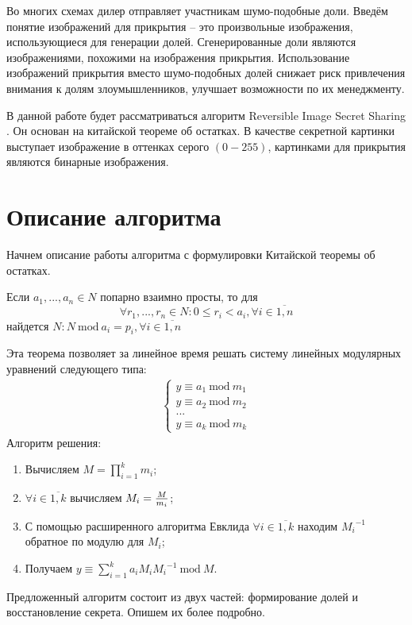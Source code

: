 \documentclass[a4paper,article,14pt]{extarticle}
\newcommand{\Mod}[1]{\ \mathrm{mod}\ #1}
\begin{document}
Во многих схемах дилер отправляет участникам шумо-подобные доли. Введём понятие изображений для прикрытия -- это произвольные 
изображения, использующиеся для генерации долей. Сгенерированные доли являются изображениями, похожими на изображения прикрытия. 
Использование изображений прикрытия вместо шумо-подобных долей снижает риск привлечения внимания к долям злоумышленников, улучшает возможности 
по их менеджменту. 

В данной работе будет рассматриваться алгоритм Reversible Image Secret Sharing \cite{RISS}. Он основан на китайской 
теореме об остатках. В качестве секретной картинки выступает изображение в оттенках серого $(0-255)$, картинками для прикрытия являются
бинарные изображения.


\newpage
\section{Описание алгоритма}
Начнем описание работы алгоритма с формулировки Китайской теоремы об остатках.

Если $ a_1,...,a_n \in N $ попарно взаимно просты, то для 
$$\forall r_1,...,r_n \in N : 0\leq r_i<a_i, \forall i\in \overline{1,n}$$
найдется $N: N \Mod a_i = p_i, \forall i\in \overline{1,n}$ 

Эта теорема позволяет за линейное время решать систему линейных модулярных уравнений следующего типа:
\begin{gather}
    \begin{cases}
    y \equiv a_1 \Mod m_1 \\
    y \equiv a_2 \Mod m_2 \\
    ... \\
    y \equiv a_k \Mod m_k
    \end{cases}
\end{gather}
\hypertarget{CRTSolve}{Алгоритм решения:}
\begin{enumerate}
    \item Вычисляем $M=\prod\limits_{i = 1}^k m_i$;
    \item $\forall i\in \overline{1,k}$ вычисляем $M_i={{M} \over {m_i}}$;
    \item С помощью расширенного алгоритма Евклида $\forall i\in \overline{1,k}$ находим ${M_i}^{-1}$ обратное по модулю для $M_i$;
    \item Получаем $y \equiv \sum\limits_{i=1}^k a_i M_i {M_i}^{-1} \Mod M$.
\end{enumerate}

Предложенный алгоритм состоит из двух частей: формирование долей и восстановление секрета. Опишем их более подробно.
\end{document}
